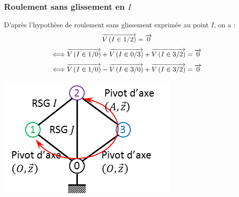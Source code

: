 \documentclass[10pt,oneside]{article}
\begin{document}
\subsubsection{Roulement sans glissement en $I$}
\begin{minipage}[c]{.6\linewidth}
D'après l'hypothèse de roulement sans glissement exprimée au point $I$, on a : 
$$\overrightarrow{V\left( {I} \in {1}/{2}\right)} = \overrightarrow{0} $$
$$ \Longleftrightarrow \overrightarrow{V\left( {I} \in {1}/{0}\right)} + \overrightarrow{V\left( {I} \in {0}/{3}\right)} + \overrightarrow{V\left( {I} \in {3}/{2}\right)} = \overrightarrow{0}$$
$$\Longleftrightarrow 
\overrightarrow{V\left( {I} \in {1}/{0}\right)} - \overrightarrow{V\left( {I} \in {3}/{0}\right)} + \overrightarrow{V\left( {I} \in {3}/{2}\right)} = \overrightarrow{0} 
$$
\end{minipage}
\begin{minipage}[c]{.3\linewidth}\hfill
\begin{center}
\includegraphics[width=.95\textwidth]{png/graphe_i}
\end{center}
\end{minipage}
\end{document}
